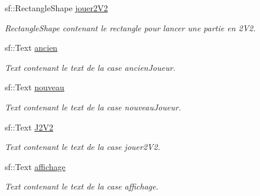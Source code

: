 \begin{DoxyCompactItemize}
\mbox{\label{class_s_f_m_l_charger_a08e12d8905d4cb98061106c9dbbe0c38}} 
sf\+::\+Rectangle\+Shape \hyperlink{class_s_f_m_l_charger_a08e12d8905d4cb98061106c9dbbe0c38}{jouer2\+V2}
\begin{DoxyCompactList}\small\item\em Rectangle\+Shape contenant le rectangle pour lancer une partie en 2\+V2. \end{DoxyCompactList}\item 
\mbox{\label{class_s_f_m_l_charger_a5374261a235a864e1aab7ab6f9daf6d7}} 
sf\+::\+Text \hyperlink{class_s_f_m_l_charger_a5374261a235a864e1aab7ab6f9daf6d7}{ancien}
\begin{DoxyCompactList}\small\item\em Text contenant le text de la case ancien\+Joueur. \end{DoxyCompactList}\item 
\mbox{\label{class_s_f_m_l_charger_aac6ac907056dad6fcc50c405c237aecc}} 
sf\+::\+Text \hyperlink{class_s_f_m_l_charger_aac6ac907056dad6fcc50c405c237aecc}{nouveau}
\begin{DoxyCompactList}\small\item\em Text contenant le text de la case nouveau\+Joueur. \end{DoxyCompactList}\item 
\mbox{\label{class_s_f_m_l_charger_a112fce58c6e9178fdca0e486055c92af}} 
sf\+::\+Text \hyperlink{class_s_f_m_l_charger_a112fce58c6e9178fdca0e486055c92af}{J2\+V2}
\begin{DoxyCompactList}\small\item\em Text contenant le text de la case jouer2\+V2. \end{DoxyCompactList}\item 
\mbox{\label{class_s_f_m_l_charger_a6f1b210f0f04ebab59f47def0ba33a0a}} 
sf\+::\+Text \hyperlink{class_s_f_m_l_charger_a6f1b210f0f04ebab59f47def0ba33a0a}{affichage}
\begin{DoxyCompactList}\small\item\em Text contenant le text de la case affichage. \end{DoxyCompactList}\item 
\mbox{\label{class_s_f_m_l_charger_aa47e87e890becc0c6c941b9535d04a3e}} 

\end{DoxyCompactItemize}
